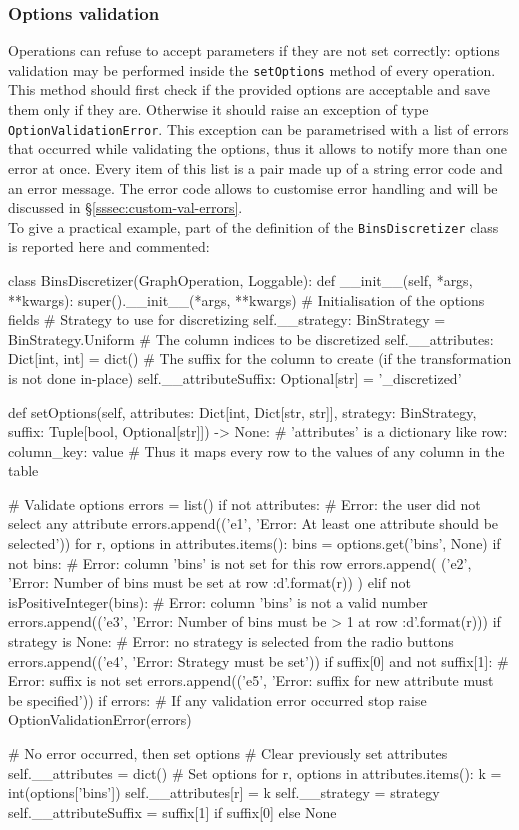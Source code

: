 \subsubsection{Options validation}\label{sssec:opt-validation-dev}
Operations can refuse to accept parameters if they are not set correctly: options validation may be performed inside the \texttt{setOptions} method of every operation. This method should first check if the provided options are acceptable and save them only if they are. Otherwise it should raise an exception of type \texttt{OptionValidationError}. This exception can be parametrised with a list of errors that occurred while validating the options, thus it allows to notify more than one error at once. Every item of this list is a pair made up of a string error code and an error message. The error code allows to customise error handling and will be discussed in §\ref{sssec:custom-val-errors}.\\
To give a practical example, part of the definition of the \texttt{BinsDiscretizer} class is reported here and commented:
\begin{python}[emph={setOptions, __init__}]
	class BinsDiscretizer(GraphOperation, Loggable):
	def __init__(self, *args, **kwargs):
	super().__init__(*args, **kwargs)
	# Initialisation of the options fields
	# Strategy to use for discretizing
	self.__strategy: BinStrategy = BinStrategy.Uniform
	# The column indices to be discretized
	self.__attributes: Dict[int, int] = dict()
	# The suffix for the column to create (if the transformation is not done in-place)
	self.__attributeSuffix: Optional[str] = '_discretized'
	
	def setOptions(self, 
	attributes: Dict[int, Dict[str, str]], 
	strategy: BinStrategy,
	suffix: Tuple[bool, Optional[str]]) -> None:
	# 'attributes' is a dictionary like {row: {column\_key: value} }
	# Thus it maps every row to the values of any column in the table
	
	# Validate options
	errors = list()
	if not attributes:
	# Error: the user did not select any attribute
	errors.append(('e1', 'Error: At least one attribute should be selected'))
	for r, options in attributes.items():
	bins = options.get('bins', None)
	if not bins:
	# Error: column 'bins' is not set for this row
	errors.append(
	('e2', 'Error: Number of bins must be set at row {:d}'.format(r))
	)
	elif not isPositiveInteger(bins):
	# Error: column 'bins' is not a valid number
	errors.append(('e3', 'Error: Number of bins must be > 1 at row {:d}'.format(r)))
	if strategy is None:
	# Error: no strategy is selected from the radio buttons
	errors.append(('e4', 'Error: Strategy must be set'))
	if suffix[0] and not suffix[1]:
	# Error: suffix is not set
	errors.append(('e5', 'Error: suffix for new attribute must be specified'))
	if errors:
	# If any validation error occurred stop
	raise OptionValidationError(errors)
	
	# No error occurred, then set options
	# Clear previously set attributes
	self.__attributes = dict()
	# Set options
	for r, options in attributes.items():
	k = int(options['bins'])
	self.__attributes[r] = k
	self.__strategy = strategy
	self.__attributeSuffix = suffix[1] if suffix[0] else None
\end{python}
